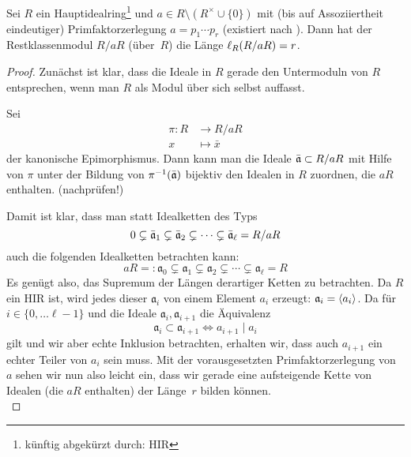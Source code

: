 \begin{thLemma}%
    \label{lem:len:hir}
    Sei $R$ ein Hauptidealring\footnote{künftig abgekürzt durch: HIR} und $a\in
    R\setminus (R^\times\cup\{0\})$ mit (bis auf Assoziiertheit eindeutiger)
    Primfaktorzerlegung $a = p_1\cdots p_r$ (existiert nach
    \cite[14--16]{talk:rief}). 
    Dann hat der Restklassenmodul $R/aR$ (über~$R$) die Länge $\operatorname{\ell}_{R}(R/aR) = r$.
\end{thLemma}
\begin{proof}
    Zunächst ist klar, dass die Ideale in $R$ gerade den Untermoduln von $R$
    entsprechen, wenn man $R$ als Modul über sich selbst auffasst.

    Sei 
    \begin{align*}
        \pi\colon R &\to R/aR   \\
                  x &\mapsto \bar x
    \end{align*}
    der kanonische Epimorphismus. Dann kann man die Ideale $\bar{\mathfrak{a}} \subset
    R/aR$ mit Hilfe von $\pi$ unter der Bildung von $\pi^{-1}(\bar{\mathfrak{a}})$
    bijektiv den Idealen in $R$ zuordnen, die $aR$ enthalten. (nachprüfen!)
    
    Damit ist klar, dass man statt Idealketten des Typs
    \[ 0 \subsetneq \bar{\mathfrak{a}}_1 \subsetneq \bar{\mathfrak{a}}_2 \subsetneq 
        \cdots \subsetneq \bar{\mathfrak{a}}_\ell = R/aR      \]
    auch die folgenden Idealketten betrachten kann:
    \[ aR =: \mathfrak{a}_0 \subsetneq \mathfrak{a}_1 
                \subsetneq \mathfrak{a}_2 \subsetneq 
                \cdots \subsetneq \mathfrak{a}_\ell = R        \]
    Es genügt also, das Supremum der Längen derartiger Ketten zu betrachten. Da
    $R$ ein HIR ist, wird jedes dieser $\mathfrak{a}_i$ von einem Element $a_i$
    erzeugt: $\mathfrak{a}_i = \langle a_i\rangle$. Da für $i\in\{0,\ldots \ell-1\}$ und
    die Ideale $\mathfrak{a}_i,\mathfrak{a}_{i+1}$ die Äquivalenz
    \[ \mathfrak{a}_i \subset \mathfrak{a}_{i+1} \iff a_{i+1} \mid a_i \]
    gilt und wir aber echte Inklusion betrachten, erhalten wir, dass auch
    $a_{i+1}$ ein echter Teiler von $a_i$ sein muss. Mit der vorausgesetzten
    Primfaktorzerlegung von $a$ sehen wir nun also leicht ein, dass wir gerade
    eine aufsteigende Kette von Idealen (die $aR$ enthalten) der Länge~$r$
    bilden können.
    \\
\end{proof}

